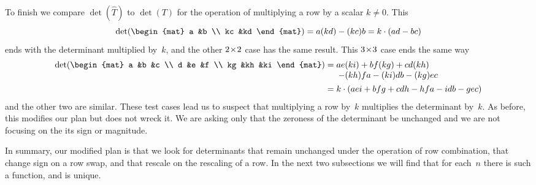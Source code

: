 To finish
we compare \( \det(\hat{T}) \) to \( \det(T) \) for the operation
of multiplying a row by a scalar $k\neq 0$. 
This
\begin{equation*}
  \det(
    \begin{mat}
      a   &b   \\
      kc  &kd
    \end{mat}
  )
  = a(kd) - (kc)b
  =k\cdot (ad-bc)
\end{equation*}
ends with the determinant multiplied by~$k$,
and the other $2 \! \times \! 2$ case has the same result.
This \(3 \! \times \! 3\) case ends the same way
\begin{align*}
  \det(
  \begin{mat}
    a    &b    &c   \\
    d    &e    &f   \\
    kg   &kh   &ki
  \end{mat}
  )
   &= \begin{array}[t]{@{}l@{}}
         ae(ki) + bf(kg) + cd(kh)                \\
         \>- (kh)fa - (ki)db - (kg)ec  
      \end{array}                                      \\
   &= k\cdot(aei + bfg + cdh - hfa - idb - gec)
\end{align*}
and the other two are similar.
These test cases lead us to suspect that multiplying a row by~$k$
multiplies the determinant by~$k$.
As before, this modifies our plan but does not wreck it.
We are asking only that the
zeroness of the determinant be unchanged and we are not focusing on the
its sign or magnitude.

In summary, our modified plan is that
we look for determinants that remain unchanged
under the operation of row combination, that change sign on
a row swap, and that rescale on the rescaling of a row.
In the next two subsections we will find that for each~$n$
there is such a function, and is unique.

